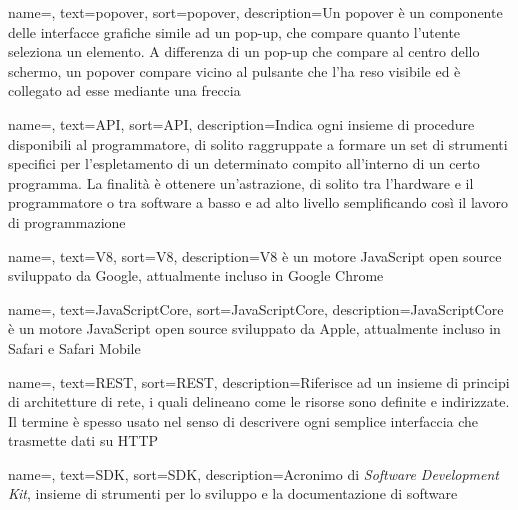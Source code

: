 {
    name=,
    text=popover,
    sort=popover,
    description={Un popover è un componente delle interfacce grafiche simile ad un pop-up, che compare quanto l'utente seleziona un elemento. A differenza di un pop-up che compare al centro dello schermo, un popover compare vicino al pulsante che l'ha reso visibile ed è collegato ad esse mediante una freccia}
}

{
    name=,
    text=API,
    sort=API,
    description={Indica ogni insieme di procedure disponibili al programmatore, di solito raggruppate a formare un set di strumenti specifici per l'espletamento di un determinato compito all'interno di un certo programma. La finalità è ottenere un'astrazione, di solito tra l'hardware e il programmatore o tra software a basso e ad alto livello semplificando così il lavoro di programmazione}
}

{
    name=,
    text=V8,
    sort=V8,
    description={V8 è un motore JavaScript open source sviluppato da Google, attualmente incluso in Google Chrome}
}

{
    name=,
    text=JavaScriptCore,
    sort=JavaScriptCore,
    description={JavaScriptCore è un motore JavaScript open source sviluppato da Apple, attualmente incluso in Safari e Safari Mobile}
}

{
    name=,
    text=REST,
    sort=REST,
    description={Riferisce ad un insieme di principi di architetture di rete, i quali delineano come le risorse sono definite e indirizzate. Il termine è spesso usato nel senso di descrivere ogni semplice interfaccia che trasmette dati su HTTP}
}

{
name=,
text=SDK,
sort=SDK,
description={Acronimo di \textit{Software Development Kit}, insieme di strumenti per lo sviluppo e la documentazione di software}
}
